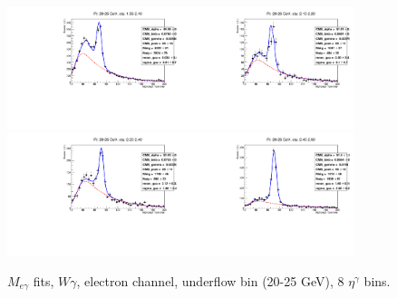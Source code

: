 \begin{figure}[htb]
\begin{center}
   \includegraphics[width=0.45\textwidth]{../figs/figs_v11/ELECTRON_WGamma/EtoGammaFits/sa_hZmass_h_Data_EtoGamma_Enr_ENDCAP_pt20to25_ieta0_noWMtCut.pdf}\includegraphics[width=0.45\textwidth]{../figs/figs_v11/ELECTRON_WGamma/EtoGammaFits/sa_hZmass_h_Data_EtoGamma_Enr_ENDCAP_pt20to25_ieta1_noWMtCut.pdf}\\
   \includegraphics[width=0.45\textwidth]{../figs/figs_v11/ELECTRON_WGamma/EtoGammaFits/sa_hZmass_h_Data_EtoGamma_Enr_ENDCAP_pt20to25_ieta2_noWMtCut.pdf}\includegraphics[width=0.45\textwidth]{../figs/figs_v11/ELECTRON_WGamma/EtoGammaFits/sa_hZmass_h_Data_EtoGamma_Enr_ENDCAP_pt20to25_ieta3_noWMtCut.pdf}\\
  \label{fig:etogFits_20to25}
  \caption{$M_{e\gamma}$ fits, $W\gamma$, electron channel, underflow bin (20-25 GeV), 8 $\eta^{\gamma}$ bins.}
  \end{center}
\end{figure}

